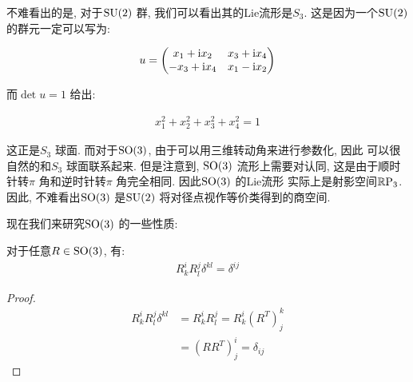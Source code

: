 \begin{remark}
  不难看出的是, 对于${\rm SU}(2)$ 群, 我们可以看出其的Lie流形是$S_3$.
  这是因为一个${\rm SU}(2)$ 的群元一定可以写为:

  \begin{equation}
    \begin{aligned}
      u =
      \begin{pmatrix}
        x_1 + {\rm i} x_2 & x_3 + {\rm i} x_4 \\
        -x_3 + {\rm i} x_4 & x_1 - {\rm i} x_2
      \end{pmatrix}
    \end{aligned}
  \end{equation}

  而$\det u=1$ 给出:
  
  \begin{equation}
    \begin{aligned}
      x_1^{2} + x_2^{2} + x_3^{2} + x_4^{2} = 1
    \end{aligned}
  \end{equation}

  这正是$S_3$ 球面. 而对于${\rm SO}(3)$, 由于可以用三维转动角来进行参数化, 因此
  可以很自然的和$S_3$ 球面联系起来. 但是注意到, ${\rm SO}(3)$ 流形上需要对认同,
  这是由于顺时针转$\pi$ 角和逆时针转$\pi$ 角完全相同. 因此${\rm SO}(3)$ 的Lie流形
  实际上是射影空间${\rm \mathbb{R}P}_3$. 因此, 不难看出${\rm SO}(3)$ 是${\rm SU}(2)$ 
  将对径点视作等价类得到的商空间.

\end{remark}

现在我们来研究${\rm SO}(3)$ 的一些性质:

\begin{lemma}
  对于任意$R\in {\rm SO}(3)$, 有:
  \begin{equation}\label{eq:SO3_tensor_invariant_1}
    \begin{aligned}
      R^{i}_{k}R^{j}_{l}\delta^{kl} = \delta^{ij}
    \end{aligned}
  \end{equation}
  
\end{lemma}
\begin{proof}
  \begin{equation}
    \begin{aligned}
      R^{i}_{k}R^{j}_{l}\delta^{kl} &= R^{i}_{k}R^{j}_{l} = R^{i}_{k}(R^{T})^{k}_{j} \\
        &= (RR^{T})^{i}_{j} = \delta_{ij}
    \end{aligned}
  \end{equation}
\end{proof}

